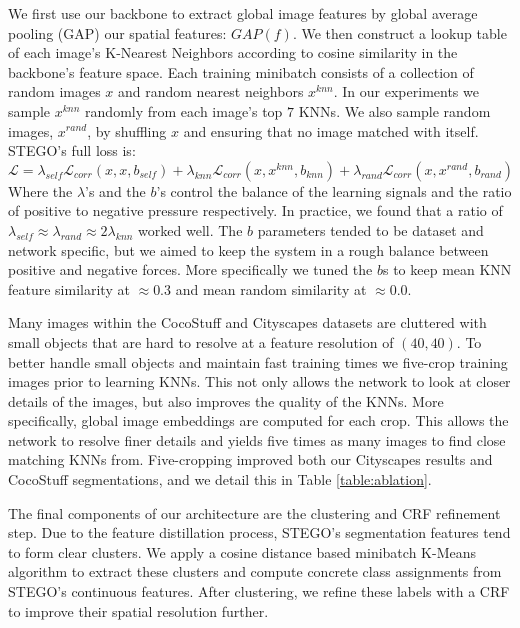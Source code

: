 \documentclass{article} \usepackage{iclr2022_conference,times}
\begin{document}
We first use our backbone to extract global image features by global average pooling (GAP) our spatial features: $GAP(f)$. We then construct a lookup table of each image's K-Nearest Neighbors according to cosine similarity in the backbone's feature space. Each training minibatch consists of a collection of random images $x$ and random nearest neighbors $x^{knn}$. In our experiments we sample $x^{knn}$ randomly from each image's top $7$ KNNs. We also sample random images, $x^{rand}$, by shuffling $x$ and ensuring that no image matched with itself. STEGO's full loss is:
\begin{equation}
\label{eq:full-loss}
    \mathcal{L} = \lambda_{self} \mathcal{L}_{corr}(x, x, b_{self}) + \lambda_{knn} \mathcal{L}_{corr}(x, x^{knn}, b_{knn}) + \lambda_{rand} \mathcal{L}_{corr}(x, x^{rand}, b_{rand})
\end{equation}
Where the $\lambda$'s and the $b$'s control the balance of the learning signals and the ratio of positive to negative pressure respectively. In practice, we found that a ratio of $\lambda_{self} \approx \lambda_{rand} \approx 2 \lambda_{knn}$ worked well. The $b$ parameters tended to be dataset and network specific, but we aimed to keep the system in a rough balance between positive and negative forces. More specifically we tuned the $b$s to keep mean KNN feature similarity at $\approx0.3$ and mean random similarity at $\approx0.0$. 

Many images within the CocoStuff and Cityscapes datasets are cluttered with small objects that are hard to resolve at a feature resolution of $(40,40)$. To better handle small objects and maintain fast training times we five-crop training images prior to learning KNNs. This not only allows the network to look at closer details of the images, but also improves the quality of the KNNs. More specifically, global image embeddings are computed for each crop. This allows the network to resolve finer details and yields five times as many images to find close matching KNNs from. Five-cropping improved both our Cityscapes results and CocoStuff segmentations, and we detail this in Table \ref{table:ablation}. 

The final components of our architecture are the clustering and CRF refinement step. Due to the feature distillation process, STEGO's segmentation features tend to form clear clusters. We apply a cosine distance based minibatch K-Means algorithm \citep{kmeans} to extract these clusters and compute concrete class assignments from STEGO's continuous features. After clustering, we refine these labels with a CRF to improve their spatial resolution further. 
\end{document}
